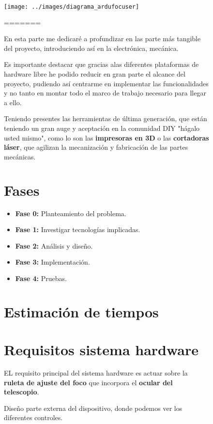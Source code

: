 \begin{figure}[h]
\centering
\texttt{[image: ../images/diagrama\_ardufocuser]}
\caption[Mockup del dispositivo hardware]{Diseño parte externa del dispositivo, donde podemos ver los diferentes controles.}
=======

\bigskip
En esta parte me dedicaré a profundizar en las parte más tangible del proyecto, introduciendo así en la electrónica, 
mecánica.

\bigskip
Es importante destacar que gracias alas  diferentes plataformas de hardware libre he podido reducir en gran parte el alcance del proyecto, pudiendo así centrarme en implementar las funcionalidades y no tanto en montar todo el marco de trabajo necesario para llegar a ello. 

\bigskip
Teniendo presentes las  herramientas de última generación, que están teniendo un gran auge y aceptación 
en la comunidad DIY \cite{DIY} "hágalo usted mismo", como lo son las \textbf{impresoras en 3D} o las \textbf{cortadoras láser}, que agilizan la mecanización y fabricación de las partes mecánicas.

\section{Fases}

\begin{itemize}
	\item \textbf{Fase 0:} Planteamiento del problema.
	\item \textbf{Fase 1:} Investigar tecnologías implicadas.
	\item \textbf{Fase 2:} Análisis y diseño.
	\item \textbf{Fase 3:} Implementación.
	\item \textbf{Fase 4:} Pruebas.
\end{itemize}


\section{Estimación de tiempos}



\section{Requisitos sistema hardware}

EL requisito principal del sistema hardware es actuar sobre la \textbf{ruleta de ajuste del foco} que incorpora el \textbf{ocular del telescopio}. 


\end{figure}
